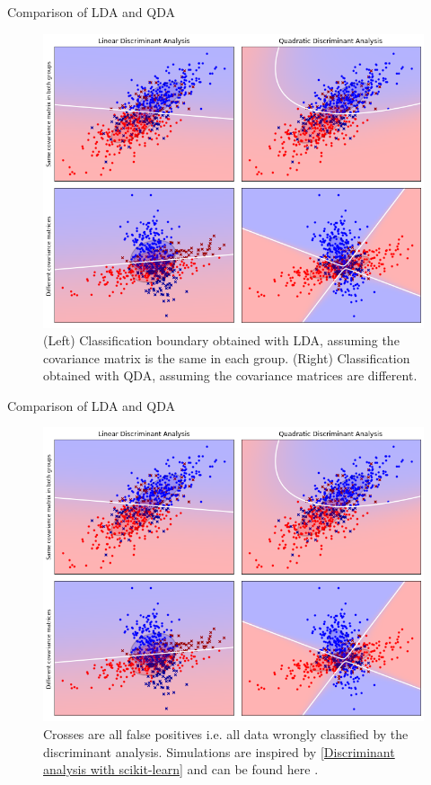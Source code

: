 \documentclass[xcolor={usenames,dvipsnames},handout]{beamer}
\begin{document}
\begin{frame}{Comparison of LDA and QDA}
	\begin{figure}[h]
		\center
		\includegraphics[height=0.75\textheight]{lda_plot}
		\caption{(Left) Classification boundary obtained with LDA, assuming the covariance matrix is the same in each group. (Right)  Classification obtained with QDA, assuming the covariance matrices are different.}
		\label{fig:lda_qda}
	\end{figure}
\end{frame}

\begin{frame}{Comparison of LDA and QDA}
	\begin{figure}[h]
		\center
		\includegraphics[height=0.75\textheight]{lda_plot}
		\caption{Crosses are all false positives i.e. all data wrongly classified by the discriminant analysis. Simulations are inspired by \href{https://scikit-learn.org/stable/modules/lda_qda.html\#mathematical-formulation-of-the-lda-and-qda-classifiers}{[Discriminant analysis with scikit-learn]} and can be found here \cite{https://sylvainlc.github.io/}.}
		\label{fig:lda_qda}
	\end{figure}
\end{frame}
\end{document}
